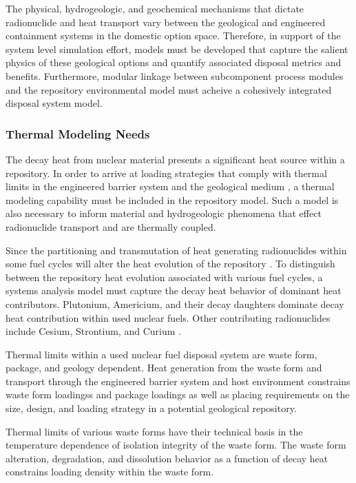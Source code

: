 
The physical, hydrogeologic, and geochemical mechanisms that dictate 
radionuclide and heat transport vary between the geological and engineered 
containment systems in the domestic option space.  Therefore, in support of the 
system level simulation effort, models must be developed that capture the 
salient physics of these geological options and quantify associated disposal 
metrics and benefits.  Furthermore, modular linkage between subcomponent process 
modules and the repository environmental model must acheive a cohesively 
integrated disposal system model. 


\subsubsection{Thermal Modeling Needs}
The decay heat from nuclear material presents a significant heat source within a 
repository. In order to arrive at loading strategies that comply with thermal 
limits in the engineered barrier system and the geological medium , a thermal 
modeling capability must be included in the repository model. Such a model is 
also necessary to inform material and hydrogeologic phenomena that effect 
radionuclide transport and are thermally coupled. 

Since the partitioning and transmutation of heat generating radionuclides within  
some fuel cycles will alter the heat evolution of the repository 
\cite{swift_applying_2010}. To distinguish  between the repository heat 
evolution associated with various fuel cycles, a systems analysis model must 
capture the decay heat behavior of dominant heat contributors.  Plutonium, 
Americium, and their decay daughters dominate decay heat contribution within 
used nuclear fuels. Other contributing radionuclides include Cesium, Strontium, 
and Curium \cite{piet_which_2007}. 

Thermal limits within a used nuclear fuel disposal system are waste form, 
package, and geology dependent. Heat generation from the waste form and 
transport through the engineered barrier system and host environment constrains 
waste form loadingss and package loadings as well as placing requirements on the 
size, design, and loading strategy in a potential geological repository.

Thermal limits of various waste forms have their technical basis in the 
temperature dependence of isolation integrity of the waste form.  The waste form 
alteration, degradation, and dissolution behavior as a function of decay heat 
constrains loading density within the waste form. 
 
